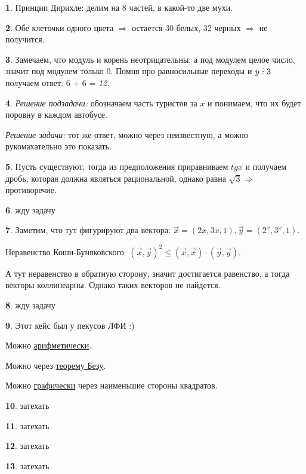 \documentclass[14pt, a4paper]{extarticle}
\theoremstyle{definition}
\newtheorem{problem}{}
\theoremstyle{definition}
\theoremstyle{remark}
\numberwithin{equation}{section}
\DeclareRobustCommand{\divby}{%
  \mathrel{\text{\vbox{\baselineskip.65ex\lineskiplimit0pt\hbox{.}\hbox{.}\hbox{.}}}}%
}
\begin{document}
\begin{problem}
    Принцип Дирихле: делим на 8 частей, в какой-то две мухи.
\end{problem}

\begin{problem}
    Обе клеточки одного цвета $\Rightarrow$ остается 30 белых, 32 черных
    $\Rightarrow$ не получится.
\end{problem}

\begin{problem}
    Замечаем, что модуль и корень неотрицательны, а под модулем 
    целое число, значит под модулем только 0. Помня про равносильные
    переходы и $y \divby 3$ получаем ответ: 6 + 6 = \textit{12}.
\end{problem}

\begin{problem}
    \textit{Решение подзадачи:} обозначаем часть туристов за $x$ и понимаем,
    что их будет поровну в каждом автобусе.

    \textit{Решение задачи:} тот же ответ, можно через неизвестную,
    а можно рукомахательно это показать.
\end{problem}

\begin{problem}
    Пусть существуют, тогда из предположения приравниваем $tgx$ и получаем
    дробь, которая должна являться рациональной, однако равна $\sqrt{3}
    \Rightarrow$ противоречие.
\end{problem}

\begin{problem}
    жду задачу
\end{problem}

\begin{problem}
    Заметим, что тут фигурируют два вектора: $\vec{x} = (2x, 3x, 1),
    \vec{y} = (2^x, 3^x, 1)$.

    Неравенство Коши-Буняковского: $(\vec{x}, \vec{y})^2 \leqslant
    (\vec{x}, \vec{x}) \cdot (\vec{y}, \vec{y})$.

    А тут неравенство в обратную сторону, значит достигается равенство,
    а тогда векторы коллинеарны. Однако таких векторов не найдется.
\end{problem}

\begin{problem}
    жду задачу
\end{problem}

\begin{problem}
    Этот кейс был у пекусов ЛФИ :)

    Можно \href{https://youtu.be/SSUCYC-nF6g}{арифметически}.

    Можно через \href{https://youtu.be/UdVr4Ak-E78}{теорему Безу}.

    Можно \href{https://youtu.be/-Gik7bfQxDM}{графически} через наименьшие стороны квадратов.
\end{problem}

\begin{problem}
    затехать
\end{problem}

\begin{problem}
    затехать
\end{problem}

\begin{problem}
    затехать
\end{problem}

\begin{problem}
    затехать
\end{problem}
\end{document}
